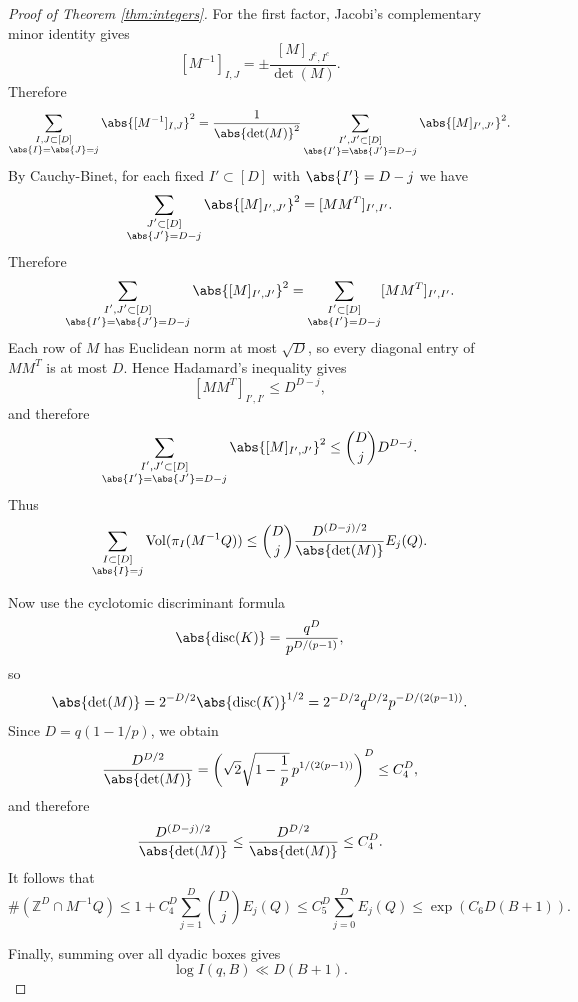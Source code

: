 \documentclass{article}
\newcommand{\bZ}{\mathbb{Z}}
\DeclareMathOperator{\Vol}{Vol}
\DeclareMathOperator{\disc}{disc}
\begin{document}
\begin{proof}[Proof of Theorem \ref{thm:integers}]
For the first factor, Jacobi's complementary minor identity gives
\[
[M^{-1}]_{I,J}
=
\pm \frac{[M]_{J^c,I^c}}{\det(M)}.
\]
Therefore
\[
\sum_{\substack{I,J \subset [D] \\ \abs{I}=\abs{J}=j}}
\abs{[M^{-1}]_{I,J}}^2
=
\frac{1}{\abs{\det(M)}^2}
\sum_{\substack{I',J' \subset [D] \\ \abs{I'}=\abs{J'}=D-j}}
\abs{[M]_{I',J'}}^2.
\]
By Cauchy-Binet, for each fixed $I' \subset [D]$ with $\abs{I'}=D-j$ we have
\[
\sum_{\substack{J' \subset [D] \\ \abs{J'}=D-j}}
\abs{[M]_{I',J'}}^2
=
[MM^T]_{I',I'}.
\]
Therefore
\[
\sum_{\substack{I',J' \subset [D] \\ \abs{I'}=\abs{J'}=D-j}}
\abs{[M]_{I',J'}}^2
=
\sum_{\substack{I' \subset [D] \\ \abs{I'}=D-j}}
[MM^T]_{I',I'}.
\]
Each row of $M$ has Euclidean norm at most $\sqrt{D}$, so every diagonal entry of $MM^T$ is at most $D$. Hence Hadamard's inequality gives
\[
[MM^T]_{I',I'} \leq D^{D-j},
\]
and therefore
\[
\sum_{\substack{I',J' \subset [D] \\ \abs{I'}=\abs{J'}=D-j}}
\abs{[M]_{I',J'}}^2
\leq
\binom{D}{j} D^{D-j}.
\]
Thus
\[
\sum_{\substack{I \subset [D] \\ \abs{I}=j}} \Vol(\pi_I(M^{-1}Q))
\leq
\binom{D}{j}\frac{D^{(D-j)/2}}{\abs{\det(M)}} E_j(Q).
\]

Now use the cyclotomic discriminant formula
\[
\abs{\disc(K)}=\frac{q^D}{p^{D/(p-1)}},
\]
so
\[
\abs{\det(M)}=2^{-D/2}\abs{\disc(K)}^{1/2}
=
2^{-D/2} q^{D/2} p^{-D/(2(p-1))}.
\]
Since $D=q(1-1/p)$, we obtain
\[
\frac{D^{D/2}}{\abs{\det(M)}}
=
\left( \sqrt{2}\sqrt{1-\frac{1}{p}}\, p^{1/(2(p-1))} \right)^D
\leq
C_4^D,
\]
and therefore
\[
\frac{D^{(D-j)/2}}{\abs{\det(M)}}
\leq
\frac{D^{D/2}}{\abs{\det(M)}}
\leq
C_4^D.
\]
It follows that
\[
\#(\bZ^D \cap M^{-1}Q)
\leq
1+C_4^D\sum_{j=1}^D \binom{D}{j} E_j(Q)
\leq
C_5^D \sum_{j=0}^D E_j(Q)
\leq
\exp\left(C_6 D(B+1)\right).
\]

Finally, summing over all dyadic boxes gives
\[
\log I(q,B) \ll D(B+1).
\]
\end{proof}





\end{document}
